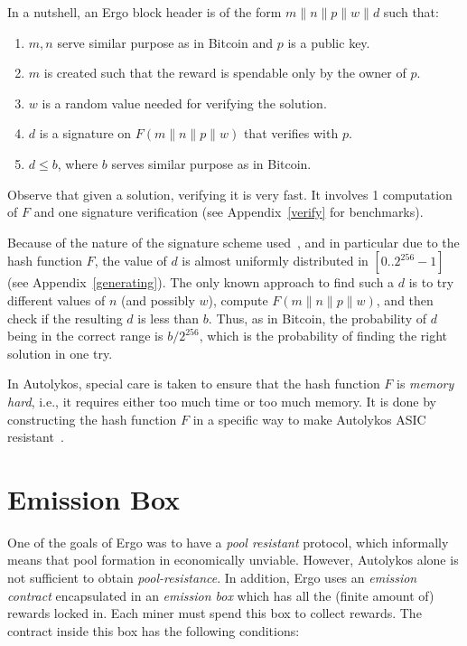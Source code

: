 \documentclass[runningheads]{llncs}
\newcommand{\powname}{Autolykos\xspace}
\begin{document}
In a nutshell, an Ergo block header is of the form $m\|n\|p\|w\|d$ such that:
\begin{enumerate}
	\item $m, n$ serve similar purpose as in Bitcoin and $p$ is a public key.
	\item $m$ is created such that the reward is spendable only by the owner of $p$.
	\item $w$ is a random value needed for verifying the solution. 
	\item $d$ is a signature on $F(m\|n\|p\|w)$ that verifies with $p$. 
	\item $d\leq b$, where $b$ serves similar purpose as in Bitcoin. 
\end{enumerate}

Observe that given a solution, verifying it is very fast. It involves 1 computation of $F$ and one signature verification (see Appendix~\ref{verify} for benchmarks).

Because of the nature of the signature scheme used~\cite{autolykos}, and in particular due to the hash function $F$, the value of $d$ is almost uniformly distributed in $[0..2^{256}-1]$ (see Appendix~\ref{generating}). The only known approach to find such a $d$ is to try different values of $n$ (and possibly $w$), compute $F(m\|n\|p\|w)$, and then check if the resulting $d$ is less than $b$.
Thus, as in Bitcoin, the probability of $d$ being in the correct range is $b/2^{256}$, which is the probability of finding the right solution in one try.
  
In \powname, special care is taken to ensure that the hash function $F$ is {\em memory hard}, i.e., it requires either too much time or too much memory. It is done by constructing the hash function $F$ in a specific way to make \powname ASIC resistant~\cite{autolykos}. 
\section{Emission Box}

\label{emission}

One of the goals of Ergo was to have a {\em pool resistant} protocol, which informally means that pool formation in economically unviable.
However, \powname alone is not sufficient to obtain {\em pool-resistance}. In addition, Ergo uses an {\em emission contract} encapsulated in an {\em emission box} which has all the (finite amount of) rewards locked in. Each miner must spend this box to collect rewards. The contract inside this box has the following conditions:
\end{document}
